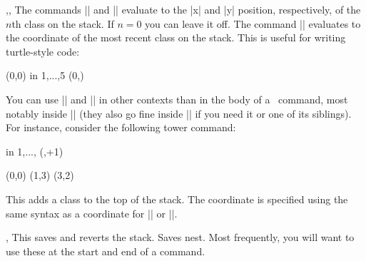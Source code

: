 \begin{sseqdata}[name = basic, cohomological Serre grading]
\begin{commandlist}{\lastx{},\lasty{},\lastclass{}}
The commands |\lastx| and |\lasty| evaluate to the |x| and |y| position, respectively, of the $n$th class on the stack. If $n = 0$ you can leave it off.
The command |\lastclass| evaluates to the coordinate of the most recent class on the stack. This is useful for writing turtle-style code:
\begin{codeexample}[width=6cm]
\DeclareSseqCommand {}
\DeclareSseqCommand {}
\begin{sseqpage}
\class(0,0)
\savestack
\foreach \y in { 1,...,5 }{
    \class(0,\y)
    \structline
}
\restorestack
\etaclass\etaclass\etaclass
\divtwoclass\divtwoclass
\end{sseqpage}
\end{codeexample}

You can use |\lastx| and |\lasty| in other contexts than in the body of a \sseqpages\ command, most notably inside |\SseqParseInt| (they also go fine inside |\pgfmathparse| if you need it or one of its siblings). For instance, consider the following tower command:
\begin{codeexample}[width=6cm]
\DeclareSseqCommand \tower { } {
    \savestack
    \SseqParseInt{}
    \foreach \n in {1,...,\numclasses}{
        \class(\lastx,\lasty+1)
        \structline
    }
    \restorestack
}
\begin{sseqpage}[y range = {0}{5}]
\class(0,0)\tower
\class(1,3)\tower
\class(3,2)\tower
\end{sseqpage}
\end{codeexample}
\end{commandlist}


\begin{command}{\pushstack{}}
This adds a class to the top of the stack. The coordinate is specified using the same syntax as a coordinate for |\structline| or |\replaceclass|.
\end{command}

\begin{commandlist}{\savestack,\restorestack}
This saves and reverts the stack. Saves nest. Most frequently, you will want to use these at the start and end of a command.
\end{commandlist}



\end{sseqdata}
